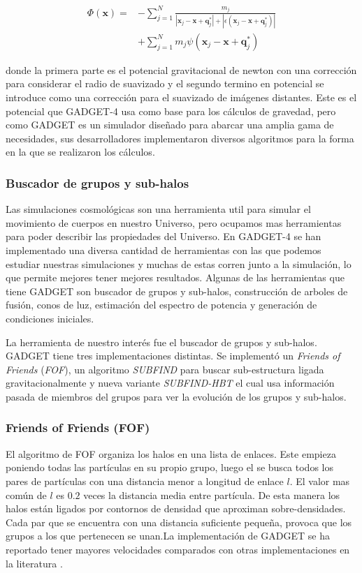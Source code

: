 \begin{align}
    \Phi (\textbf{x}) = &- \sum_{j=1}^{N} \frac{m_j}{|\textbf{x}_j-\textbf{x}+\textbf{q}^*_j| + |\epsilon(\textbf{x}_j-\textbf{x}+\textbf{q}^*_j)|} \nonumber \\
    &+ \sum_{j=1}^{N} m_j \psi (\textbf{x}_j-\textbf{x}+\textbf{q}^*_j) \label{eq:Pot}
\end{align}

\noindent donde la primera parte es el potencial gravitacional de newton con una corrección para considerar el radio de suavizado y el segundo termino en potencial se introduce como una corrección para el suavizado de imágenes distantes. Este es el potencial que GADGET-4 usa como base para los cálculos de gravedad, pero como GADGET es un simulador diseñado para abarcar una amplia gama de necesidades, sus desarrolladores implementaron diversos algoritmos para la forma en la que se realizaron los cálculos.


\subsubsection{Buscador de grupos y sub-halos}

Las simulaciones cosmológicas son una herramienta util para simular el movimiento de cuerpos en nuestro Universo, pero ocupamos mas herramientas para poder describir las propiedades del Universo. En GADGET-4 se han implementado una diversa cantidad de herramientas con las que podemos estudiar nuestras simulaciones y muchas de estas corren junto a la simulación, lo que permite mejores tener mejores resultados. Algunas de las herramientas que tiene GADGET son buscador de grupos y sub-halos, construcción de arboles de fusión, conos de luz, estimación del espectro de potencia y generación de condiciones iniciales. 

La herramienta de nuestro interés fue el buscador de grupos y sub-halos. GADGET tiene tres implementaciones distintas. Se implementó un \textit{Friends of Friends} (\textit{FOF}), un algoritmo \textit{SUBFIND} para buscar sub-estructura ligada gravitacionalmente y nueva variante \textit{SUBFIND-HBT} el cual usa información pasada de miembros del grupos para ver la evolución de los grupos y sub-halos.

\subsubsection{ Friends of Friends (\textbf{FOF}) }
El algoritmo de FOF organiza los halos en una lista de enlaces. Este empieza poniendo todas las partículas en su propio grupo, luego el se busca todos los pares de partículas con una distancia menor a longitud de enlace $l$. El valor mas común de $l$ es $0.2$ veces la distancia media entre partícula. De esta manera los halos están ligados por contornos de densidad que aproximan sobre-densidades. Cada par que se encuentra con una distancia suficiente pequeña, provoca que los grupos a los que pertenecen se unan.La implementación de GADGET se ha reportado tener mayores velocidades comparados con otras implementaciones en la literatura \cite{2021MNRAS.506.2871S}.

